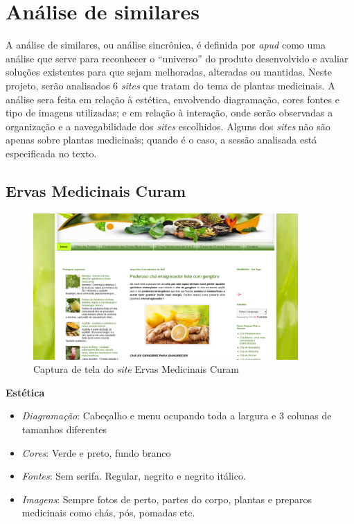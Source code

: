 \section{Análise de similares}\label{analise-de-similares}

A análise de similares, ou análise sincrônica, é definida por \textcite{bonsiepe83} \emph{apud} \textcite{pazmino10} como uma análise que serve para reconhecer o ``universo'' do produto desenvolvido e avaliar soluções existentes para que sejam melhoradas, alteradas ou mantidas.
Neste projeto, serão analisados 6 \emph{sites} que tratam do tema de plantas medicinais. A análise sera feita em relação à estética, envolvendo diagramação, cores fontes e tipo de imagens utilizadas; e em relação à interação, onde serão observadas a organização e a navegabilidade dos \emph{sites} escolhidos.
Alguns dos \emph{sites} não são apenas sobre plantas medicinais; quando é o caso, a sessão analisada está especificada no texto.

\subsection{Ervas Medicinais Curam}\label{ervas-medicinais-curam}

\begin{figure}
\centering
\caption{\label{fig-emcuram}Captura de tela do \emph{site} Ervas Medicinais Curam}
\includegraphics[width=0.9\textwidth]{images/similares/emcuram.png}
\end{figure}

\textbf{Estética}

\begin{itemize}
\item
  \emph{Diagramação}: Cabeçalho e menu ocupando toda a largura e 3 colunas de tamanhos diferentes
\item
  \emph{Cores}: Verde e preto, fundo branco
\item
  \emph{Fontes}: Sem serifa. Regular, negrito e negrito itálico.
\item
  \emph{Imagens}: Sempre fotos de perto, partes do corpo, plantas e preparos medicinais como chás, pós, pomadas etc.
\end{itemize}

